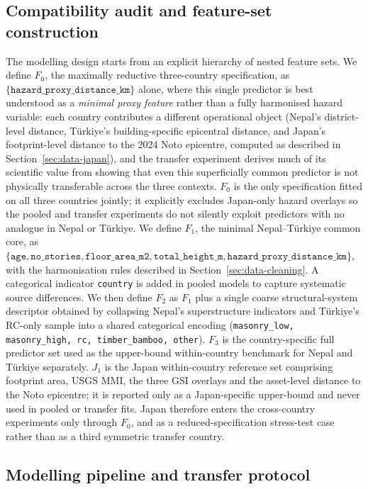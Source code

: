 \documentclass[11pt,a4paper]{article}
\begin{document}
\subsection{Compatibility audit and feature-set construction}
\label{subsec:methods-compatibility}

The modelling design starts from an explicit hierarchy of nested feature sets. We define $F_0$, the maximally reductive three-country specification, as $\{\texttt{hazard\_proxy\_distance\_km}\}$ alone, where this single predictor is best understood as a \emph{minimal proxy feature} rather than a fully harmonised hazard variable: each country contributes a different operational object (Nepal's district-level distance, T\"urkiye's building-specific epicentral distance, and Japan's footprint-level distance to the 2024 Noto epicentre, computed as described in Section~\ref{sec:data-japan}), and the transfer experiment derives much of its scientific value from showing that even this superficially common predictor is not physically transferable across the three contexts. $F_0$ is the only specification fitted on all three countries jointly; it explicitly excludes Japan-only hazard overlays so the pooled and transfer experiments do not silently exploit predictors with no analogue in Nepal or T\"urkiye. We define $F_1$, the minimal Nepal--T\"urkiye common core, as $\{\texttt{age}, \texttt{no\_stories}, \texttt{floor\_area\_m2}, \texttt{total\_height\_m}, \texttt{hazard\_proxy\_distance\_km}\}$, with the harmonisation rules described in Section~\ref{sec:data-cleaning}. A categorical indicator \texttt{country} is added in pooled models to capture systematic source differences. We then define $F_2$ as $F_1$ plus a single coarse structural-system descriptor obtained by collapsing Nepal's superstructure indicators and T\"urkiye's RC-only sample into a shared categorical encoding (\texttt{masonry\_low, masonry\_high, rc, timber\_bamboo, other}). $F_3$ is the country-specific full predictor set used as the upper-bound within-country benchmark for Nepal and T\"urkiye separately. $J_1$ is the Japan within-country reference set comprising footprint area, USGS MMI, the three GSI overlays and the asset-level distance to the Noto epicentre; it is reported only as a Japan-specific upper-bound and never used in pooled or transfer fits. Japan therefore enters the cross-country experiments only through $F_0$, and as a reduced-specification stress-test case rather than as a third symmetric transfer country.

\subsection{Modelling pipeline and transfer protocol}
\label{subsec:methods-empirical}
\end{document}
